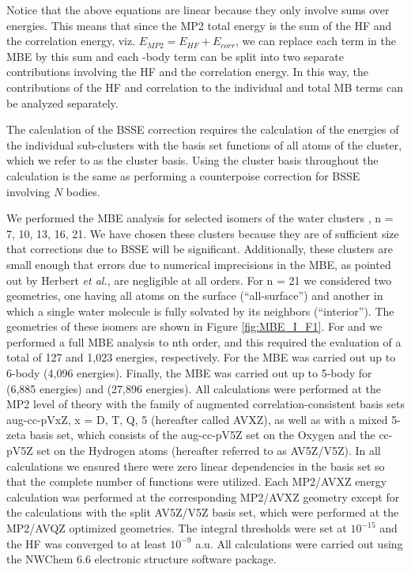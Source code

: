 \documentclass [11pt, proquest] {uwthesis}[2020/02/24]
\begin{document}
Notice that the above equations are linear because they only involve sums over energies. This means that since the MP2 total energy is the sum of the HF and the correlation energy, viz. $E_{MP2}=E_{HF}+E_{corr}$, we can replace each term in the MBE by this sum and each -body term can be split into two separate contributions involving the HF and the correlation energy. In this way, the contributions of the HF and correlation to the individual and total MB terms can be analyzed separately.
\par The calculation of the BSSE correction requires the calculation of the energies of the individual sub-clusters with the basis set functions of all atoms of the cluster, which we refer to as the cluster basis. Using the cluster basis throughout the calculation is the same as performing a counterpoise correction for BSSE involving $N$ bodies.
\par We performed the MBE analysis for selected isomers of the water clusters , n = 7, 10, 13, 16, 21.\autocite{lagutschenkov_spectroscopic_2005, yoo_high-level_2010, iwata_cooperative_2013, bulusu_lowest-energy_2006, yoo_structures_2017} We have chosen these clusters because they are of sufficient size that corrections due to BSSE will be significant. Additionally, these clusters are small enough that errors due to numerical imprecisions in the MBE, as pointed out by Herbert \textit{et al.},\autocite{richard_understanding_2014} are negligible at all orders. For n = 21 we considered two geometries, one having all atoms on the surface (“all-surface”) and another in which a single water molecule is fully solvated by its neighbors (“interior”). The geometries of these isomers are shown in Figure \ref{fig:MBE_I_F1}. For  and  we performed a full MBE analysis to nth order, and this required the evaluation of a total of 127 and 1,023 energies, respectively. For  the MBE was carried out up to 6-body (4,096 energies). Finally, the MBE was carried out up to 5-body for  (6,885 energies) and  (27,896 energies). All calculations were performed at the MP2 level of theory with the family of augmented correlation-consistent basis sets\autocite{dunning_gaussian_1989} aug-cc-pVxZ, x = D, T, Q, 5 (hereafter called AVXZ), as well as with a mixed 5-zeta basis set, which consists of the aug-cc-pV5Z set on the Oxygen and the cc-pV5Z set on the Hydrogen atoms (hereafter referred to as AV5Z/V5Z). In all calculations we ensured there were zero linear dependencies in the basis set so that the complete number of functions were utilized. Each MP2/AVXZ energy calculation was performed at the corresponding MP2/AVXZ geometry except for the calculations with the split AV5Z/V5Z basis set, which were performed at the MP2/AVQZ optimized geometries. The integral thresholds were set at $10^{-15}$ and the HF was converged to at least $10^{-9}$ a.u. All calculations were carried out using the NWChem 6.6 electronic structure software package.\autocite{valiev_nwchem_2010}
\end{document}
